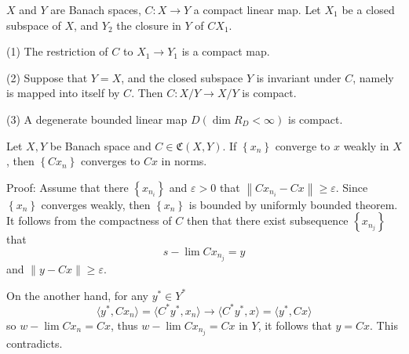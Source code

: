 \documentclass[12pt, oneside]{book}
\begin{document}
\begin{theorem}
    $X$ and $Y$ are Banach spaces, $ {C}: X \rightarrow Y$ a compact linear map. Let $X_1$ be a closed subspace of $X$, and $Y_2$ the closure in $Y$ of $ {C} X_1$.

    (1) The restriction of $ {C}$ to $X_1 \rightarrow Y_1$ is a compact map.

    (2) Suppose that $Y=X$, and the closed subspace $Y$ is invariant under $ {C}$, namely is mapped into itself by $ {C}$. Then $ {C}: X / Y \rightarrow X / Y$ is compact.

    (3) A degenerate bounded linear map $ {D}\left(\operatorname{dim} R_{ {D}}<\infty\right)$ is compact.
\end{theorem}


\begin{theorem}
    Let $X,Y$ be Banach space and $C\in \mathfrak{C}(X,Y)$. If $\left\{x_n\right\}$  converge  to $x$ weakly in $X$, then $\left\{Cx_n\right\}$ converges to $Cx$ in norms.

    Proof:
    Assume that there $\left\{x_{n_i}\right\}$ and $\varepsilon>0$ that
    $\left\| Cx_{n_i} -Cx\right\| \geq \varepsilon$.
    Since $\left\{x_n\right\}$ converges weakly, then $\left\{x_n\right\}$ is bounded by uniformly bounded theorem.  It follows from the compactness of $C$ then that there exist subsequence $\left\{x_{n_j}\right\}$  that
    \begin{equation*}
        s-
        \lim Cx_{n_j} = y
    \end{equation*}
    and $\left\|y-Cx\right\| \geq \varepsilon$.

    On the another hand, for any $y^* \in Y^*$
    \begin{equation*}
        \langle y^*, Cx_{n}\rangle
        =
        \langle C^*y^*, x_{n}\rangle
        \to
        \langle C^*y^*, x \rangle
        = \langle y^*, Cx\rangle
    \end{equation*}
    so
    $w-\lim Cx_{n}=Cx$, thus $w-\lim Cx_{n_j}=Cx$ in $Y$, it follows that $y=Cx$. This contradicts.
\end{theorem}
\end{document}
